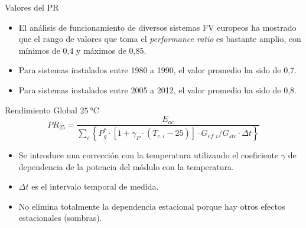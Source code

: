 \documentclass[aspectratio=169, usenames,svgnames,dvipsnames]{beamer}
\begin{document}
\begin{frame}[label={sec:orgf1f3c69}]{Valores del PR}
\begin{itemize}
\item El análisis de funcionamiento de diversos sistemas FV europeos ha
mostrado que el rango de valores que toma el \emph{performance ratio} es
bastante amplio, con mínimos de 0,4 y máximos de 0,85.

\item Para sistemas instalados entre 1980 a 1990, \alert{el valor promedio ha sido de
0,7}.

\item Para sistemas instalados entre 2005 a 2012, \alert{el valor promedio ha
sido de 0,8}.
\end{itemize}
\end{frame}


\begin{frame}[label={sec:orgb545d35}]{Rendimiento Global \(\qty{25}{\celsius}\)}
\[
  PR_{25} = \frac{E_{ac}}{\sum_i \left\{P_g^* \cdot \left[1 + \gamma_P \cdot(T_{c,i} - 25)\right]\cdot G_{ef,i}/G_{stc} \cdot \Delta t \right\}}
\]
\begin{itemize}
\item Se introduce una corrección con la temperatura utilizando el coeficiente \(\gamma\) de dependencia de la potencia del módulo con la temperatura.
\item \(\Delta t\) es el intervalo temporal de medida.
\item No elimina totalmente la dependencia estacional porque hay otros efectos estacionales (sombras).
\end{itemize}
\end{frame}
\end{document}
